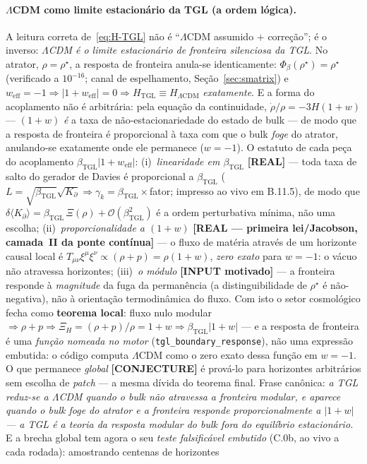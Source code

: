 \documentclass[12pt,a4paper]{article}
\newcommand{\betatgl}{\beta_{\text{TGL}}}
\newcommand{\Kpartial}{K_{\partial}}
\newcommand{\rhostar}{\rho^{\star}}
\newcommand{\TGL}{\textsc{TGL}}
\begin{document}
\paragraph{$\Lambda$CDM como limite estacionário da \TGL{} (a ordem lógica).}
A leitura correta de~\eqref{eq:H-TGL} não é ``$\Lambda$CDM assumido $+$ correção'';
é o inverso: \emph{$\Lambda$CDM é o limite estacionário de fronteira silenciosa da
\TGL}.  No atrator, $\rho=\rhostar$, a resposta de fronteira anula-se identicamente:
$\Phi_\beta(\rhostar)=\rhostar$ (verificado a $10^{-16}$; canal de espelhamento,
Seção~\ref{sec:smatrix}) e $w_{\text{eff}}=-1 \Rightarrow |1+w_{\text{eff}}|=0
\Rightarrow H_{\text{TGL}}\equiv H_{\Lambda\text{CDM}}$ \emph{exatamente}.  E a forma
do acoplamento não é arbitrária: pela equação da continuidade,
$\dot\rho/\rho=-3H(1+w)$ --- $(1+w)$ \emph{é} a taxa de não-estacionariedade do
estado de bulk --- de modo que a resposta de fronteira é proporcional à taxa com que
o bulk \emph{foge} do atrator, anulando-se exatamente onde ele permanece ($w=-1$).
O estatuto de cada peça do acoplamento $\betatgl|1+w_{\text{eff}}|$:
(i)~\emph{linearidade em $\betatgl$} \textbf{[REAL]} --- toda taxa de salto do gerador
de Davies é proporcional a $\betatgl$ ($L=\sqrt{\betatgl}\sqrt{\Kpartial}\Rightarrow
\gamma_k=\betatgl\times$fator; impresso ao vivo em B.11.5), de modo que
$\delta\langle\Kpartial\rangle=\betatgl\,\Xi(\rho)+\mathcal O(\betatgl^2)$ é a ordem
perturbativa mínima, não uma escolha; (ii)~\emph{proporcionalidade a $(1+w)$}
\textbf{[REAL --- primeira lei/Jacobson, camada~II da ponte contínua]} --- o fluxo de
matéria através de um horizonte causal local é $T_{\mu\nu}\xi^\mu\xi^\nu\propto(\rho+p)
=\rho(1+w)$, \emph{zero exato} para $w=-1$: o vácuo não atravessa horizontes;
(iii)~\emph{o módulo} \textbf{[INPUT motivado]} --- a fronteira responde à
\emph{magnitude} da fuga da permanência (a distinguibilidade de $\rhostar$ é
não-negativa), não à orientação termodinâmica do fluxo. Com isto o setor
cosmológico fecha como \textbf{teorema local}: fluxo nulo modular $\Rightarrow\rho+p
\Rightarrow\Xi_H=(\rho+p)/\rho=1+w\Rightarrow\betatgl|1+w|$ --- e a resposta de
fronteira é uma \emph{função nomeada no motor} (\texttt{tgl\_boundary\_response}), não
uma expressão embutida: o código computa $\Lambda$CDM como o zero exato dessa função em
$w=-1$. O que permanece \emph{global} \textbf{[CONJECTURE]} é prová-lo para horizontes
arbitrários sem escolha de \emph{patch} --- a mesma dívida do teorema final. Frase
canônica: \emph{a \TGL{} reduz-se a $\Lambda$CDM quando o bulk não atravessa a fronteira
modular, e aparece quando o bulk foge do atrator e a fronteira responde
proporcionalmente a $|1+w|$ --- a \TGL{} é a teoria da resposta modular do bulk fora do
equilíbrio estacionário.} E a brecha global tem agora o seu \emph{teste
falsificável embutido} (C.0b, ao vivo a cada rodada): amostrando centenas de horizontes
\end{document}
